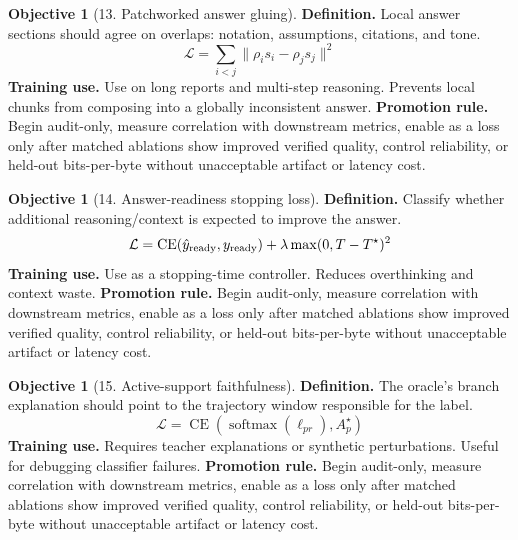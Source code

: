 \documentclass[11pt]{article}
\theoremstyle{definition}
\newtheorem{objective}[theorem]{Objective}
\theoremstyle{remark}
\newcommand{\CE}{\operatorname{CE}}
\newcommand{\loss}{\mathcal{L}}
\numberwithin{equation}{section}
\begin{document}
\begin{objective}[13. Patchworked answer gluing]
\textbf{Definition.} Local answer sections should agree on overlaps: notation, assumptions, citations, and tone.
\begin{equation}
    \loss=\sum_{i<j}\|\rho_i s_i-\rho_j s_j\|^2
\end{equation}
\textbf{Training use.} Use on long reports and multi-step reasoning. Prevents local chunks from composing into a globally inconsistent answer.
\textbf{Promotion rule.} Begin audit-only, measure correlation with downstream metrics, enable as a loss only after matched ablations show improved verified quality, control reliability, or held-out bits-per-byte without unacceptable artifact or latency cost.
\end{objective}


\begin{objective}[14. Answer-readiness stopping loss]
\textbf{Definition.} Classify whether additional reasoning/context is expected to improve the answer.
\begin{equation}
    \loss=\CE(\hat y_{\rm ready}, y_{\rm ready})+\lambda\max(0,T-T^\star)^2
\end{equation}
\textbf{Training use.} Use as a stopping-time controller. Reduces overthinking and context waste.
\textbf{Promotion rule.} Begin audit-only, measure correlation with downstream metrics, enable as a loss only after matched ablations show improved verified quality, control reliability, or held-out bits-per-byte without unacceptable artifact or latency cost.
\end{objective}


\begin{objective}[15. Active-support faithfulness]
\textbf{Definition.} The oracle's branch explanation should point to the trajectory window responsible for the label.
\begin{equation}
    \loss=\CE(\operatorname{softmax}(\ell_{pr}),A_p^\star)
\end{equation}
\textbf{Training use.} Requires teacher explanations or synthetic perturbations. Useful for debugging classifier failures.
\textbf{Promotion rule.} Begin audit-only, measure correlation with downstream metrics, enable as a loss only after matched ablations show improved verified quality, control reliability, or held-out bits-per-byte without unacceptable artifact or latency cost.
\end{objective}
\end{document}
